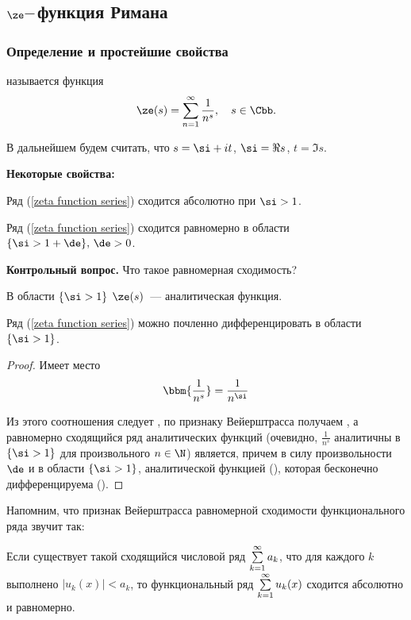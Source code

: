 \subsection{$\ze$--\,функция Римана}
\subsubsection{Определение и простейшие свойства}

\begin{df}
   называется функция
  \begin{gather}
    \label{zeta function series}
    \ze(s)=\sum_{n=1}^{\infty}\dfrac1{n^s},\quad s\in\Cbb.
  \end{gather}
\end{df}

В дальнейшем будем считать, что $s=\si+it$, $\si=\Re s$, $t=\Im s$.

\textbf{Некоторые свойства:}
\begin{points}{0}
  \item Ряд (\ref{zeta function series}) сходится абсолютно при $\si>1$.
  \item Ряд (\ref{zeta function series}) сходится равномерно в области $\{\si>1+\de\},\,\de>0$.\par
  \textbf{Контрольный вопрос.} Что такое равномерная сходимость?
  \item В области $\{\si>1\}\;\,\ze(s)$~— аналитическая функция.
  \item Ряд (\ref{zeta function series}) можно почленно дифференцировать в области $\{\si>1\}$.
\end{points}
\begin{proof}Имеет место
  $$
    \bbm{\frac1{n^s}}=\frac1{n^\si}
  $$

  Из этого соотношения следует , по признаку Вейерштрасса получаем , 
	а равномерно сходящийся ряд аналитических функций (очевидно, $\tfrac1{n^s}$ 
	аналитичны в $\{\si>1\}$ для произвольного $n\in\N$) является, причем в силу 
	произвольности $\de$ и в области $\{\si>1\}$, аналитической функцией (), 
	которая бесконечно дифференцируема ().
\end{proof}

Напомним, что признак Вейерштрасса равномерной сходимости функционального ряда звучит так:
\begin{theorem}
	Если существует такой сходящийся числовой ряд $\sum\limits_{k=1}^\infty a_k$, что 
	для каждого $k$ выполнено $|u_k(x)|<a_k$, то функциональный ряд 
	$\sum\limits_{k=1}^\infty u_k(x)$ сходится абсолютно и равномерно.
\end{theorem}

